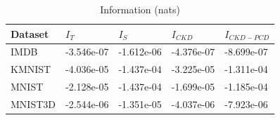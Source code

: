 \begin{table}
\caption{Information (nats)}
\label{tab:info}
\begin{tabular}{lllll}
\toprule
Dataset & $I_T$ & $I_S$ & $I_{CKD}$ & $I_{CKD-PCD}$ \\
\midrule
IMDB & -3.546e-07 & -1.612e-06 & -4.376e-07 & -8.699e-07 \\
KMNIST & -4.036e-05 & -1.437e-04 & -3.225e-05 & -1.311e-04 \\
MNIST & -2.128e-05 & -1.437e-04 & -1.699e-05 & -1.185e-04 \\
MNIST3D & -2.544e-06 & -1.351e-05 & -4.037e-06 & -7.923e-06 \\
\bottomrule
\end{tabular}
\end{table}
